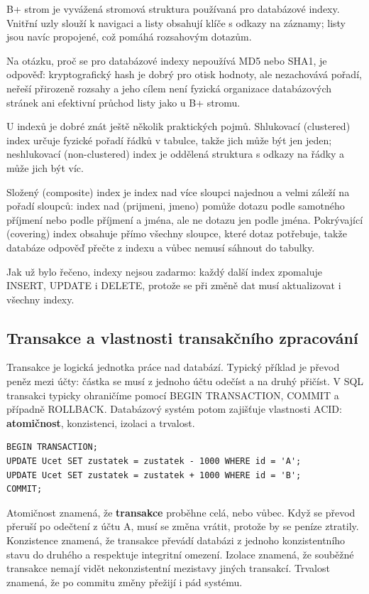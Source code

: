 \documentclass[11pt,a4paper]{article}
\begin{document}
B+ strom je vyvážená stromová struktura používaná pro databázové indexy. Vnitřní uzly slouží k navigaci a listy obsahují klíče s odkazy na záznamy; listy jsou navíc propojené, což pomáhá rozsahovým dotazům.

Na otázku, proč se pro databázové indexy nepoužívá MD5 nebo SHA1, je odpověď: kryptografický hash je dobrý pro otisk hodnoty, ale nezachovává pořadí, neřeší přirozeně rozsahy a jeho cílem není fyzická organizace databázových stránek ani efektivní průchod listy jako u B+ stromu.

U indexů je dobré znát ještě několik praktických pojmů. Shlukovací (clustered) index určuje fyzické pořadí řádků v tabulce, takže jich může být jen jeden; neshlukovací (non-clustered) index je oddělená struktura s odkazy na řádky a může jich být víc.

Složený (composite) index je index nad více sloupci najednou a velmi záleží na pořadí sloupců: index nad (prijmeni, jmeno) pomůže dotazu podle samotného příjmení nebo podle příjmení a jména, ale ne dotazu jen podle jména. Pokrývající (covering) index obsahuje přímo všechny sloupce, které dotaz potřebuje, takže databáze odpověď přečte z indexu a vůbec nemusí sáhnout do tabulky.

Jak už bylo řečeno, indexy nejsou zadarmo: každý další index zpomaluje INSERT, UPDATE i DELETE, protože se při změně dat musí aktualizovat i všechny indexy.

\subsection*{Transakce a vlastnosti transakčního zpracování}

Transakce je logická jednotka práce nad databází. Typický příklad je převod peněz mezi účty: částka se musí z jednoho účtu odečíst a na druhý přičíst. V SQL transakci typicky ohraničíme pomocí BEGIN TRANSACTION, COMMIT a případně ROLLBACK. Databázový systém potom zajišťuje vlastnosti ACID: \textbf{atomičnost}, konzistenci, izolaci a trvalost.

\begin{codebox}
\small
\begin{verbatim}
BEGIN TRANSACTION;
UPDATE Ucet SET zustatek = zustatek - 1000 WHERE id = 'A';
UPDATE Ucet SET zustatek = zustatek + 1000 WHERE id = 'B';
COMMIT;
\end{verbatim}
\end{codebox}

Atomičnost znamená, že \textbf{transakce} proběhne celá, nebo vůbec. Když se převod přeruší po odečtení z účtu A, musí se změna vrátit, protože by se peníze ztratily. Konzistence znamená, že transakce převádí databázi z jednoho konzistentního stavu do druhého a respektuje integritní omezení. Izolace znamená, že souběžné transakce nemají vidět nekonzistentní mezistavy jiných transakcí. Trvalost znamená, že po commitu změny přežijí i pád systému.
\end{document}
